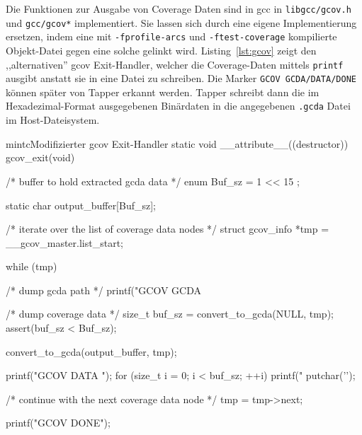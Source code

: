 Die Funktionen zur Ausgabe von Coverage Daten sind in gcc in
\texttt{libgcc/gcov.h} und \texttt{gcc/gcov*} implementiert. Sie lassen sich
durch eine eigene Implementierung ersetzen, indem eine mit
\texttt{-fprofile-arcs} und \texttt{-ftest-coverage} kompilierte Objekt-Datei
gegen eine solche gelinkt wird. Listing~\ref{lst:gcov} zeigt den
,,alternativen'' gcov Exit-Handler, welcher die Coverage-Daten mittels
\texttt{printf} ausgibt anstatt sie in eine Datei zu schreiben. Die Marker
\texttt{GCOV GCDA/DATA/DONE} können später von Tapper erkannt werden. Tapper
schreibt dann die im Hexadezimal-Format ausgegebenen Binärdaten in die
angegebenen \texttt{.gcda} Datei im Host-Dateisystem.

\begin{mintlisting}[label=lst:gcov]{mintc}{Modifizierter gcov Exit-Handler}
static void __attribute__((destructor))
gcov_exit(void)
{
  /* buffer to hold extracted gcda data */
  enum { Buf_sz = 1 << 15 };

  static char output_buffer[Buf_sz];

  /* iterate over the list of coverage data nodes */
  struct gcov_info *tmp = __gcov_master.list_start;

  while (tmp)
    {
      /* dump gcda path */
      printf("GCOV GCDA %

      /* dump coverage data */
      size_t buf_sz = convert_to_gcda(NULL, tmp);
      assert(buf_sz < Buf_sz);

      convert_to_gcda(output_buffer, tmp);

      printf("GCOV DATA ");
      for (size_t i = 0; i < buf_sz; ++i)
        printf("%
      putchar('\n');

      /* continue with the next coverage data node */
      tmp = tmp->next;
    }

  printf("GCOV DONE\n");
}
\end{mintlisting}
